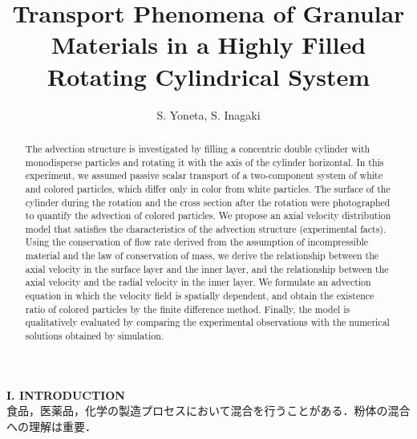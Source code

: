\documentclass[prl,twocolumn,superscriptaddress]{revtex4}
\begin{document}
\title{Transport Phenomena of Granular Materials in a Highly Filled Rotating Cylindrical System}
\author{S. Yoneta, S. Inagaki}

\begin{abstract}
The advection structure is investigated by filling a concentric double cylinder with monodisperse particles and rotating it with the axis of the cylinder horizontal. In this experiment, we assumed passive scalar transport of a two-component system of white and colored particles, which differ only in color from white particles. The surface of the cylinder during the rotation and the cross section after the rotation were photographed to quantify the advection of colored particles. We propose an axial velocity distribution model that satisfies the characteristics of the advection structure (experimental facts). Using the conservation of flow rate derived from the assumption of incompressible material and the law of conservation of mass, we derive the relationship between the axial velocity in the surface layer and the inner layer, and the relationship between the axial velocity and the radial velocity in the inner layer. We formulate an advection equation in which the velocity field is spatially dependent, and obtain the existence ratio of colored particles by the finite difference method. Finally, the model is qualitatively evaluated by comparing the experimental observations with the numerical solutions obtained by simulation.
\end{abstract}
\maketitle

{\bf I. INTRODUCTION} \\
食品，医薬品，化学の製造プロセスにおいて混合を行うことがある．粉体の混合への理解は重要．\\
\end{document}
